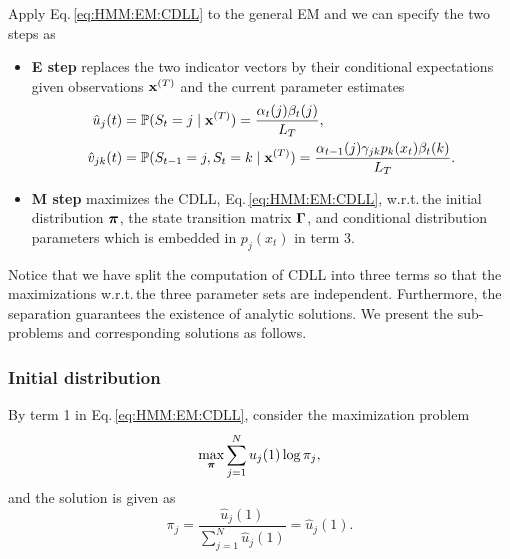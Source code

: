 Apply Eq.\,\ref{eq:HMM:EM:CDLL} to the general EM and we can specify the two steps as
		\begin{itemize}
		\item \textbf{E step} replaces the two indicator vectors by their conditional expectations
		given observations ${\mathbf x}^{(T)}$ and the current parameter estimates
			\begin{subequations}
			\begin{align}
			\label{eq:HMM:EM:ind_u}
			\hat{u}_j(t) & = \mathbb{P}(S_t = j \mid {\mathbf x}^{(T)}) = \frac{\alpha_t(j)\beta_t(j)}{L_T},\\
			\label{eq:HMM:EM:ind_v}
			\hat{v}_{jk}(t) & = \mathbb{P}(S_{t-1} = j,S_t = k \mid {\mathbf x}^{(T)}) = 
				\frac{\alpha_{t-1}(j)\gamma_{jk}p_k(x_t)\beta_t(k)}{L_T}.
			\end{align}
			\end{subequations}
		\item \textbf{M step} maximizes the CDLL, Eq.\,\ref{eq:HMM:EM:CDLL},
		w.r.t.\,the initial distribution ${\boldsymbol\pi}$, the state transition matrix ${\boldsymbol\Gamma}$,
		and conditional distribution parameters which is embedded in $p_j(x_t)$ in term 3.
		\end{itemize}

Notice that we have split the computation of CDLL into three terms 
so that the maximizations w.r.t.\,the three parameter sets are independent.
Furthermore, the separation guarantees the existence of analytic solutions.
We present the sub-problems and corresponding solutions as follows.

\subsubsection{Initial distribution}
\label{sec:HMM:EM:algo:initial}
By term 1 in Eq.\,\ref{eq:HMM:EM:CDLL}, consider the maximization problem
		\begin{equation}
		\label{eq:HMM:EM:max:1}
		\max_{{\boldsymbol\pi}} \sum_{j=1}^{N} u_j(1)\log\pi_j,
		\end{equation}
and the solution is given as
		\begin{equation}
		\label{eq:HMM:EM:sol:1}
		\pi_j = \frac{\hat{u}_j(1)}{\sum_{j=1}^{N}\hat{u}_j(1)} = \hat{u}_j(1).
		\end{equation}


